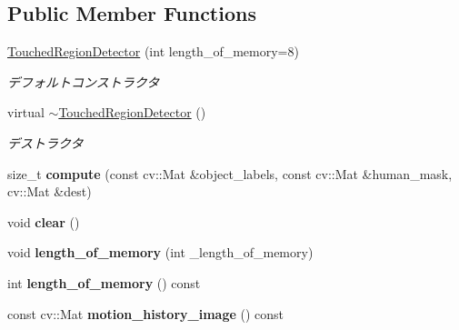 \subsection*{Public Member Functions}
\begin{DoxyCompactItemize}
\item 
\hypertarget{classskl_1_1_touched_region_detector_a9665342f49cd4df671c960fd436bcab2}{}\label{classskl_1_1_touched_region_detector_a9665342f49cd4df671c960fd436bcab2} 
\hyperlink{classskl_1_1_touched_region_detector_a9665342f49cd4df671c960fd436bcab2}{Touched\+Region\+Detector} (int length\+\_\+of\+\_\+memory=8)
\begin{DoxyCompactList}\small\item\em デフォルトコンストラクタ \end{DoxyCompactList}\item 
\hypertarget{classskl_1_1_touched_region_detector_a46db7f12eee5abec5dcbe6bcd837d762}{}\label{classskl_1_1_touched_region_detector_a46db7f12eee5abec5dcbe6bcd837d762} 
virtual \hyperlink{classskl_1_1_touched_region_detector_a46db7f12eee5abec5dcbe6bcd837d762}{$\sim$\+Touched\+Region\+Detector} ()
\begin{DoxyCompactList}\small\item\em デストラクタ \end{DoxyCompactList}\item 
\hypertarget{classskl_1_1_touched_region_detector_a8350b9fb985faba891b60088fd2765d3}{}\label{classskl_1_1_touched_region_detector_a8350b9fb985faba891b60088fd2765d3} 
size\+\_\+t {\bfseries compute} (const cv\+::\+Mat \&object\+\_\+labels, const cv\+::\+Mat \&human\+\_\+mask, cv\+::\+Mat \&dest)
\item 
\hypertarget{classskl_1_1_touched_region_detector_a498025688c3dc4a6adceef0626213f67}{}\label{classskl_1_1_touched_region_detector_a498025688c3dc4a6adceef0626213f67} 
void {\bfseries clear} ()
\item 
\hypertarget{classskl_1_1_touched_region_detector_ace235a7ea7adccab07ebb76350e6e023}{}\label{classskl_1_1_touched_region_detector_ace235a7ea7adccab07ebb76350e6e023} 
void {\bfseries length\+\_\+of\+\_\+memory} (int \+\_\+length\+\_\+of\+\_\+memory)
\item 
\hypertarget{classskl_1_1_touched_region_detector_ad1de05484be3a50b07a50f1242c9dc17}{}\label{classskl_1_1_touched_region_detector_ad1de05484be3a50b07a50f1242c9dc17} 
int {\bfseries length\+\_\+of\+\_\+memory} () const
\item 
\hypertarget{classskl_1_1_touched_region_detector_a9421371c23730541235eabf18e233797}{}\label{classskl_1_1_touched_region_detector_a9421371c23730541235eabf18e233797} 
const cv\+::\+Mat {\bfseries motion\+\_\+history\+\_\+image} () const
\end{DoxyCompactItemize}

